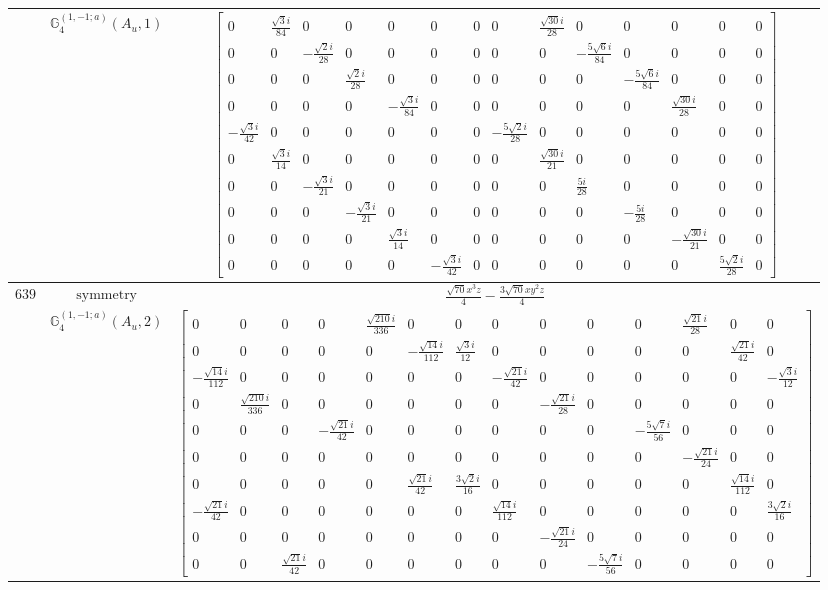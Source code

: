 \documentclass[fleqn,8pt,landscape]{jsarticle}
\begin{document}
\begin{longtable}{ccc}
$  $ & $ \mathbb{G}_{4}^{(1,-1;a)}(A_{u},1) $ & $ \begin{bmatrix} 0 & \frac{\sqrt{3} i}{84} & 0 & 0 & 0 & 0 & 0 & 0 & \frac{\sqrt{30} i}{28} & 0 & 0 & 0 & 0 & 0 \\ 0 & 0 & - \frac{\sqrt{2} i}{28} & 0 & 0 & 0 & 0 & 0 & 0 & - \frac{5 \sqrt{6} i}{84} & 0 & 0 & 0 & 0 \\ 0 & 0 & 0 & \frac{\sqrt{2} i}{28} & 0 & 0 & 0 & 0 & 0 & 0 & - \frac{5 \sqrt{6} i}{84} & 0 & 0 & 0 \\ 0 & 0 & 0 & 0 & - \frac{\sqrt{3} i}{84} & 0 & 0 & 0 & 0 & 0 & 0 & \frac{\sqrt{30} i}{28} & 0 & 0 \\ - \frac{\sqrt{3} i}{42} & 0 & 0 & 0 & 0 & 0 & 0 & - \frac{5 \sqrt{2} i}{28} & 0 & 0 & 0 & 0 & 0 & 0 \\ 0 & \frac{\sqrt{3} i}{14} & 0 & 0 & 0 & 0 & 0 & 0 & \frac{\sqrt{30} i}{21} & 0 & 0 & 0 & 0 & 0 \\ 0 & 0 & - \frac{\sqrt{3} i}{21} & 0 & 0 & 0 & 0 & 0 & 0 & \frac{5 i}{28} & 0 & 0 & 0 & 0 \\ 0 & 0 & 0 & - \frac{\sqrt{3} i}{21} & 0 & 0 & 0 & 0 & 0 & 0 & - \frac{5 i}{28} & 0 & 0 & 0 \\ 0 & 0 & 0 & 0 & \frac{\sqrt{3} i}{14} & 0 & 0 & 0 & 0 & 0 & 0 & - \frac{\sqrt{30} i}{21} & 0 & 0 \\ 0 & 0 & 0 & 0 & 0 & - \frac{\sqrt{3} i}{42} & 0 & 0 & 0 & 0 & 0 & 0 & \frac{5 \sqrt{2} i}{28} & 0 \end{bmatrix} $ \\ \hline
$ 639 $ & $ \text{symmetry} $ & $ \frac{\sqrt{70} x^{3} z}{4} - \frac{3 \sqrt{70} x y^{2} z}{4} $ \\
$  $ & $ \mathbb{G}_{4}^{(1,-1;a)}(A_{u},2) $ & $ \begin{bmatrix} 0 & 0 & 0 & 0 & \frac{\sqrt{210} i}{336} & 0 & 0 & 0 & 0 & 0 & 0 & \frac{\sqrt{21} i}{28} & 0 & 0 \\ 0 & 0 & 0 & 0 & 0 & - \frac{\sqrt{14} i}{112} & \frac{\sqrt{3} i}{12} & 0 & 0 & 0 & 0 & 0 & \frac{\sqrt{21} i}{42} & 0 \\ - \frac{\sqrt{14} i}{112} & 0 & 0 & 0 & 0 & 0 & 0 & - \frac{\sqrt{21} i}{42} & 0 & 0 & 0 & 0 & 0 & - \frac{\sqrt{3} i}{12} \\ 0 & \frac{\sqrt{210} i}{336} & 0 & 0 & 0 & 0 & 0 & 0 & - \frac{\sqrt{21} i}{28} & 0 & 0 & 0 & 0 & 0 \\ 0 & 0 & 0 & - \frac{\sqrt{21} i}{42} & 0 & 0 & 0 & 0 & 0 & 0 & - \frac{5 \sqrt{7} i}{56} & 0 & 0 & 0 \\ 0 & 0 & 0 & 0 & 0 & 0 & 0 & 0 & 0 & 0 & 0 & - \frac{\sqrt{21} i}{24} & 0 & 0 \\ 0 & 0 & 0 & 0 & 0 & \frac{\sqrt{21} i}{42} & \frac{3 \sqrt{2} i}{16} & 0 & 0 & 0 & 0 & 0 & \frac{\sqrt{14} i}{112} & 0 \\ - \frac{\sqrt{21} i}{42} & 0 & 0 & 0 & 0 & 0 & 0 & \frac{\sqrt{14} i}{112} & 0 & 0 & 0 & 0 & 0 & \frac{3 \sqrt{2} i}{16} \\ 0 & 0 & 0 & 0 & 0 & 0 & 0 & 0 & - \frac{\sqrt{21} i}{24} & 0 & 0 & 0 & 0 & 0 \\ 0 & 0 & \frac{\sqrt{21} i}{42} & 0 & 0 & 0 & 0 & 0 & 0 & - \frac{5 \sqrt{7} i}{56} & 0 & 0 & 0 & 0 \end{bmatrix} $ \\ \hline

\end{longtable}
\end{document}
